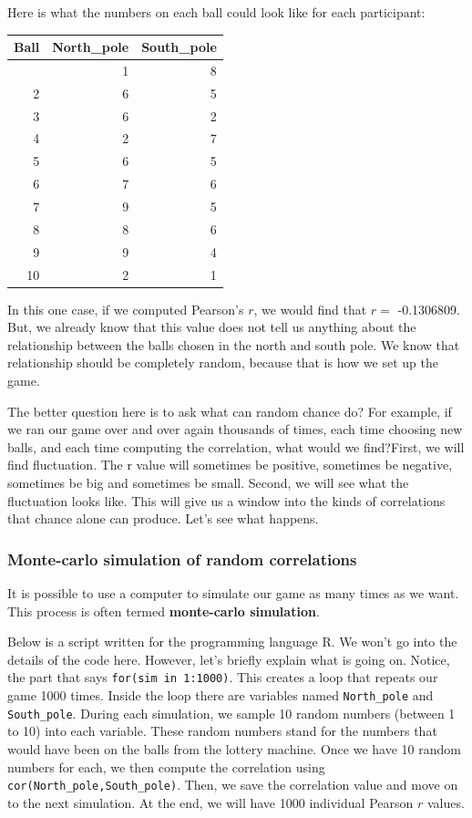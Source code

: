 \documentclass[
  letterpaper,
  DIV=11,
  numbers=noendperiod]{scrreprt}
\begin{document}
Here is what the numbers on each ball could look like for each
participant:

\begin{longtable}[]{@{}rrr@{}}
\toprule\noalign{}
Ball & North\_pole & South\_pole \\
\midrule\noalign{}
\endhead
\bottomrule\noalign{}
\endlastfoot
1 & 1 & 8 \\
2 & 6 & 5 \\
3 & 6 & 2 \\
4 & 2 & 7 \\
5 & 6 & 5 \\
6 & 7 & 6 \\
7 & 9 & 5 \\
8 & 8 & 6 \\
9 & 9 & 4 \\
10 & 2 & 1 \\
\end{longtable}

In this one case, if we computed Pearson's \(r\), we would find that
\(r =\) -0.1306809. But, we already know that this value does not tell
us anything about the relationship between the balls chosen in the north
and south pole. We know that relationship should be completely random,
because that is how we set up the game.

The better question here is to ask what can random chance do? For
example, if we ran our game over and over again thousands of times, each
time choosing new balls, and each time computing the correlation, what
would we find?First, we will find fluctuation. The r value will
sometimes be positive, sometimes be negative, sometimes be big and
sometimes be small. Second, we will see what the fluctuation looks like.
This will give us a window into the kinds of correlations that chance
alone can produce. Let's see what happens.

\subsubsection{Monte-carlo simulation of random
correlations}\label{monte-carlo-simulation-of-random-correlations}

It is possible to use a computer to simulate our game as many times as
we want. This process is often termed \textbf{monte-carlo simulation}.

Below is a script written for the programming language R. We won't go
into the details of the code here. However, let's briefly explain what
is going on. Notice, the part that says \texttt{for(sim\ in\ 1:1000)}.
This creates a loop that repeats our game 1000 times. Inside the loop
there are variables named \texttt{North\_pole} and \texttt{South\_pole}.
During each simulation, we sample 10 random numbers (between 1 to 10)
into each variable. These random numbers stand for the numbers that
would have been on the balls from the lottery machine. Once we have 10
random numbers for each, we then compute the correlation using
\texttt{cor(North\_pole,South\_pole)}. Then, we save the correlation
value and move on to the next simulation. At the end, we will have 1000
individual Pearson \(r\) values.
\end{document}
